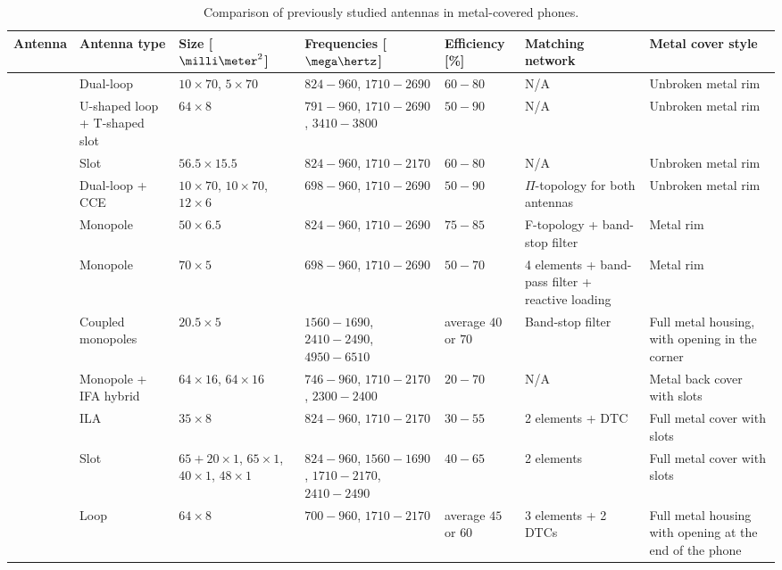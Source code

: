 \begin{table}
\centering
\caption{Comparison of previously studied antennas in metal-covered phones.}
\begin{tabular}{|M{0.08\textheight}|M{0.13\textheight}|M{0.09\textheight}|M{0.15\textheight}|M{0.13\textheight}|M{0.14\textheight}|M{0.16\textheight}|}
    \hline
    \textbf{Antenna} & \textbf{Antenna type} & \textbf{Size [$\milli\meter^2$]} & \textbf{Frequencies [$\mega\hertz$]} & \textbf{Efficiency [\%]} & \textbf{Matching network} & \textbf{Metal cover style}\\
    \hline
    \cite{ban_dual_loop} & Dual-loop & $10\times70$, $5\times70$ & $824-960$, $1710-2690$ & $60-80$ & N/A & Unbroken metal rim\\
    \hline
    \cite{hsu_compact} & U-shaped loop + T-shaped slot & $64\times8$ & $791-960$, $1710-2690$, $3410-3800$ & $50-90$ & N/A & Unbroken metal rim\\
    \hline
    \cite{yuan_slot} & Slot & $56.5\times15.5$ & $824-960$, $1710-2170$ & $60-80$ & N/A & Unbroken metal rim\\
    \hline
    \cite{stanley_lte_mimo} & Dual-loop + CCE & $10\times70$, $10\times70$, $12\times6$ & $698-960$, $1710-2690$ & $50-90$ & $\Pi$-topology for both antennas & Unbroken metal rim\\
    \hline
    \cite{lee_monopole} & Monopole & $50\times6.5$ & $824-960$, $1710-2690$ & $75-85$ & F-topology + band-stop filter & Metal rim\\
    \hline
    \cite{chen_metal_frame} & Monopole & $70\times5$ & $698-960$, $1710-2690$ & $50-70$ & 4 elements + band-pass filter + reactive loading & Metal rim\\
    \hline
    \cite{wu_pier} & Coupled monopoles & $20.5\times5$ & $1560-1690$, $2410-2490$, $4950-6510$ & average $40$ or $70$ & Band-stop filter & Full metal housing, with opening in the corner\\
    \hline
    \cite{son_wideband_mimo} & Monopole + IFA hybrid & $64\times16$, $64\times16$ & $746-960$, $1710-2170$, $2300-2400$ & $20-70$ & N/A & Metal back cover with slots\\
    \hline
    \cite{wu_tunable} & ILA & $35\times8$ & $824-960$, $1710-2170$ & $30-55$ & 2 elements + DTC & Full metal cover with slots\\
    \hline
    \cite{zhong_pier} & Slot & $65+20\times1$, $65\times1$, $40\times1$, $48\times1$ & $824-960$, $1560-1690$, $1710-2170$, $2410-2490$ & $40-65$ & 2 elements & Full metal cover with slots\\
    \hline
    \cite{chen_compact_lte} & Loop & $64\times8$ & $700-960$, $1710-2170$ & average $45$ or $60$ & 3 elements + 2 DTCs & Full metal housing with opening at the end of the phone\\
    \hline
\end{tabular}
\end{table}

\clearpage